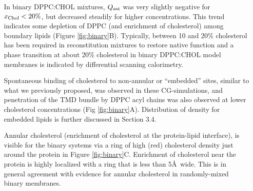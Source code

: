 In binary DPPC:CHOL mixtures, $Q_{\mathrm{sat}}$ was very slightly negative for $x_{\mathrm{Chol}} < 20\%$, but decreased steadily for higher concentrations. This trend indicates some depletion of DPPC (and enrichment of cholesterol) among \nachr~ boundary lipids (Figure \ref{fig:binary}B).  Typically, between 10 and 20\% cholesterol has been required in reconstitution mixtures to restore native function  \citep{Fong1986,Dalziel1980,Criado1982}  and a phase transition at about 20\% cholesterol in binary DPPC:CHOL model membranes is indicated by differential scanning calorimetry.\citep{Marsh2010} 

Spontaneous binding of cholesterol to non-annular or ``embedded'' sites, similar to what we previously proposed\citep{Brannigan2008}, was observed in these CG-simulations, and penetration of the TMD bundle by DPPC acyl chains was also observed at lower cholesterol concentrations (Fig \ref{fig:binary}A).  Distribution of density for embedded lipids is further discussed in Section 3.4.  

Annular cholesterol (enrichment of cholesterol at the protein-lipid interface), is visible for the binary systems via a ring of high (red) cholesterol density just around the protein in Figure \ref{fig:binary}C. Enrichment of cholesterol near the protein is highly localized with a ring that is less than 5\AA~wide. This is in general agreement with evidence for annular cholesterol in randomly-mixed binary membranes. \citep{Barrantes2010}




